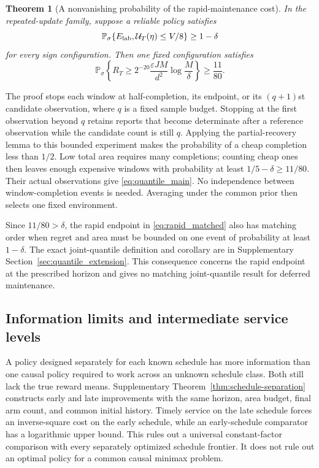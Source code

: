 \documentclass[11pt]{article}
\newtheorem{theorem}{Theorem}[section]
\theoremstyle{remark}
\newcommand{\Prob}{\mathbb P}
\begin{document}
\begin{theorem}[A nonvanishing probability of the rapid-maintenance cost]
\label{thm:quantile_main}
In the repeated-update family, suppose a reliable policy satisfies
\[
 \Prob_\sigma\{E_{\rm lab},\mathcal U_T(\eta)\le V/8\}\ge1-\delta
\]
for every sign configuration. Then one fixed configuration satisfies
\begin{equation}
 \Prob_\sigma\left\{R_T\ge
 2^{-20}\frac{\varepsilon JM}{d^2}\log\frac M\delta\right\}
 \ge\frac{11}{80}.
 \label{eq:quantile_main}
\end{equation}
\end{theorem}

The proof stops each window at half-completion, its endpoint, or its
$(q+1)$st candidate observation, where $q$ is a fixed sample budget. Stopping
at the first observation beyond $q$ retains reports that become determinate
after a reference observation while the candidate count is still $q$.
Applying the partial-recovery lemma to this bounded experiment makes the
probability of a cheap completion less than $1/2$. Low total area requires
many completions; counting cheap ones then leaves enough expensive windows
with probability at least $1/5-\delta\ge11/80$. Their actual observations
give \eqref{eq:quantile_main}. No independence between window-completion
events is needed. Averaging under the common prior then selects one fixed
environment.

Since $11/80>\delta$, the rapid endpoint in \eqref{eq:rapid_matched} also
has matching order when regret and area must be bounded on one event of
probability at least $1-\delta$. The exact joint-quantile definition and
corollary are in Supplementary Section~\ref{sec:quantile_extension}. This
consequence concerns the rapid endpoint at the prescribed horizon and gives
no matching joint-quantile result for deferred maintenance.


\subsection{Information limits and intermediate service levels}

A policy designed separately for each known schedule has more information
than one causal policy required to work across an unknown schedule class.
Both still lack the true reward means. Supplementary
Theorem~\ref{thm:schedule-separation} constructs early and late improvements
with the same horizon, area budget, final arm count, and common initial
history. Timely service on the late schedule forces an inverse-square
cost on the early schedule, while an early-schedule comparator has a
logarithmic upper bound. This rules out a universal constant-factor
comparison with every separately optimized schedule frontier. It does
not rule out an optimal policy for a common causal minimax problem.
\end{document}
